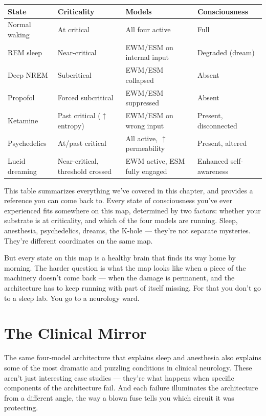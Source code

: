\documentclass[11pt, twoside, openright]{book}
\begin{document}
{\small
\noindent
\begin{tabularx}{\linewidth}{X X X X}
\toprule
\textbf{State} & \textbf{Criticality} & \textbf{Models} & \textbf{Consciousness} \\
\midrule
Normal waking & At critical & All four active & Full \\[4pt]
REM sleep & Near-critical & EWM/ESM on internal input & Degraded (dream) \\[4pt]
Deep NREM & Subcritical & EWM/ESM collapsed & Absent \\[4pt]
Propofol & Forced subcritical & EWM/ESM suppressed & Absent \\[4pt]
Ketamine & Past critical ($\uparrow$ entropy) & EWM/ESM on wrong input & Present, disconnected \\[4pt]
Psychedelics & At/past critical & All active, $\uparrow$ permeability & Present, altered \\[4pt]
Lucid dreaming & Near-critical, threshold crossed & EWM active, ESM fully engaged & Enhanced self-awareness \\[4pt]
\bottomrule
\end{tabularx}
}


This table summarizes everything we've covered in this chapter, and provides a reference you can come back to. Every state of consciousness you've ever experienced fits somewhere on this map, determined by two factors: whether your substrate is at criticality, and which of the four models are running. Sleep, anesthesia, psychedelics, dreams, the K-hole --- they're not separate mysteries. They're different coordinates on the same map.

But every state on this map is a healthy brain that finds its way home by morning. The harder question is what the map looks like when a piece of the machinery doesn't come back --- when the damage is permanent, and the architecture has to keep running with part of itself missing. For that you don't go to a sleep lab. You go to a neurology ward.


\chapter{The Clinical Mirror}

The same four-model architecture that explains sleep and anesthesia also explains some of the most dramatic and puzzling conditions in clinical neurology. These aren't just interesting case studies --- they're what happens when specific components of the architecture fail. And each failure illuminates the architecture from a different angle, the way a blown fuse tells you which circuit it was protecting.
\end{document}
